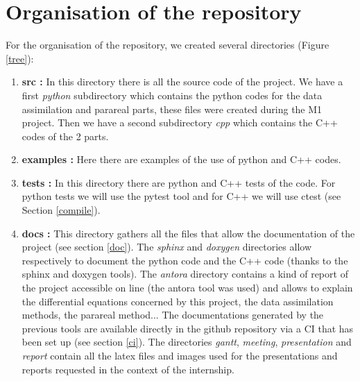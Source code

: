 \section{Organisation of the repository}

	\begin{minipage}{0.65\linewidth}
		For the organisation of the repository, we created several directories (Figure \ref{tree}):
		\begin{enumerate}[label=\textbullet]
			\item \textbf{src :} In this directory there is all the source code of the project. We have a first \textit{python} subdirectory which contains the python codes for the data assimilation and parareal parts, these files were created during the M1 project. Then we have a second subdirectory \textit{cpp} which contains the C++ codes of the 2 parts.
			\item \textbf{examples :} Here there are examples of the use of python and C++ codes.
			\item \textbf{tests :} In this directory there are python and C++ tests of the code. For python tests we will use the pytest tool and for C++ we will use ctest (see Section \ref{compile}).
			\item \textbf{docs :} This directory gathers all the files that allow the documentation of the project (see section \ref{doc}). The \textit{sphinx} and \textit{doxygen} directories allow respectively to document the python code and the C++ code (thanks to the sphinx and doxygen tools). The \textit{antora} directory contains a kind of report of the project accessible on line (the antora tool was used) and allows to explain the differential equations concerned by this project, the data assimilation methods, the parareal method... The documentations generated by the previous tools are available directly in the github repository via a CI that has been set up (see section \ref{ci}).
			The directories \textit{gantt}, \textit{meeting}, \textit{presentation} and \textit{report} contain all the latex files and images used for the presentations and reports requested in the context of the internship.
		\end{enumerate}
	\end{minipage} \qquad
